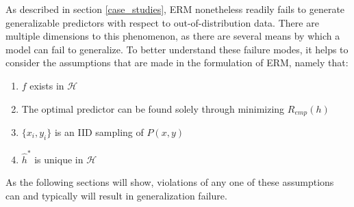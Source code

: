 		As described in section \ref{case_studies}, ERM nonetheless readily fails to generate generalizable predictors with respect to out-of-distribution data. There are multiple dimensions to this phenomenon, as there are several means by which a model can fail to generalize. To better understand these failure modes, it helps to consider the assumptions that are made in the formulation of ERM, namely that:
		\begin{enumerate}
			\item \(f\) exists in \(\mathcal{H}\) \label{underfit}
			\item The optimal predictor can be found solely through minimizing \(R_{emp}(h)\)\label{overfit}
			\item \(\{x_i, y_i\}\) is an IID sampling of \(P(x,y)\) \label{structural_misalignment}
			\item \(\hat{h}^*\) is unique in \(\mathcal{H}\)\label{underspecification}
		\end{enumerate}
		As the following sections will show, violations of any one of these assumptions can and typically will result in generalization failure. 

